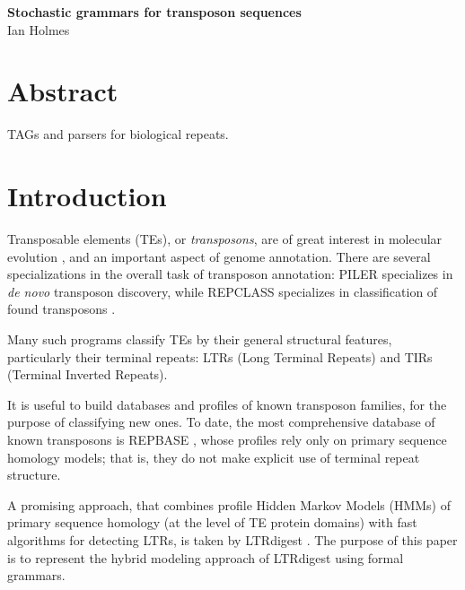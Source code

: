 \documentclass[10pt]{article}
\date{}
\newcommand\titlestring{Stochastic grammars for transposon sequences}
\newcommand\authorstring{
Ian Holmes
}
\begin{document}
\begin{flushleft}
  {\Large
    \textbf{\titlestring}
  }
\\
\authorstring
\end{flushleft}


\section*{Abstract}
TAGs and parsers for biological repeats.

\tableofcontents



\section{Introduction}

Transposable elements (TEs), or {\em transposons}, are of great interest in molecular evolution \cite{Feschotte2007}, and an important aspect of genome annotation.
There are several specializations in the overall task of transposon annotation:
PILER \cite{EdgarMyers2005} specializes in {\em de novo} transposon discovery,
while REPCLASS specializes in classification of found transposons \cite{FeschotteKeswaniEtAl2009}.

Many such programs classify TEs by their general structural features, particularly their terminal repeats:
LTRs (Long Terminal Repeats) and TIRs (Terminal Inverted Repeats).

It is useful to build databases and profiles of known transposon families, for the purpose of classifying new ones.
To date, the most comprehensive database of known transposons is REPBASE \cite{KapitonovJurka2008},
whose profiles rely only on primary sequence homology models;
that is, they do not make explicit use of terminal repeat structure.

A promising approach, that combines profile Hidden Markov Models (HMMs) of primary sequence homology (at the level of TE protein domains)
with fast algorithms for detecting LTRs,
is taken by LTRdigest \cite{pmid19786494}.
The purpose of this paper is to represent the hybrid modeling approach of LTRdigest using formal grammars.
\end{document}
